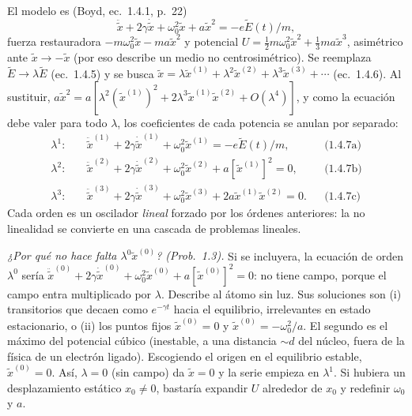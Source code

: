  El modelo es (Boyd, ec.~1.4.1, p.~22)
\[
\ddot{\tilde x}+2\gamma\dot{\tilde x}+\omega_0^2\tilde x+a\tilde x^2=-e\tilde E(t)/m,
\]
fuerza restauradora $-m\omega_0^2\tilde x-ma\tilde x^2$ y potencial $U=\tfrac12m\omega_0^2\tilde x^2+\tfrac13ma\tilde x^3$, asimétrico ante $\tilde x\to-\tilde x$ (por eso describe un medio no centrosimétrico). Se reemplaza $\tilde E\to\lambda\tilde E$ (ec.~1.4.5) y se busca $\tilde x=\lambda\tilde x^{(1)}+\lambda^2\tilde x^{(2)}+\lambda^3\tilde x^{(3)}+\cdots$ (ec.~1.4.6). Al sustituir, $a\tilde x^2=a[\lambda^2(\tilde x^{(1)})^2+2\lambda^3\tilde x^{(1)}\tilde x^{(2)}+O(\lambda^4)]$, y como la ecuación debe valer para todo $\lambda$, los coeficientes de cada potencia se anulan por separado:
\begin{align*}
\lambda^1:&\quad \ddot{\tilde x}^{(1)}+2\gamma\dot{\tilde x}^{(1)}+\omega_0^2\tilde x^{(1)}=-e\tilde E(t)/m, &&\text{(1.4.7a)}\\
\lambda^2:&\quad \ddot{\tilde x}^{(2)}+2\gamma\dot{\tilde x}^{(2)}+\omega_0^2\tilde x^{(2)}+a[\tilde x^{(1)}]^2=0, &&\text{(1.4.7b)}\\
\lambda^3:&\quad \ddot{\tilde x}^{(3)}+2\gamma\dot{\tilde x}^{(3)}+\omega_0^2\tilde x^{(3)}+2a\tilde x^{(1)}\tilde x^{(2)}=0. &&\text{(1.4.7c)}
\end{align*}
Cada orden es un oscilador \emph{lineal} forzado por los órdenes anteriores: la no linealidad se convierte en una cascada de problemas lineales.

\emph{¿Por qué no hace falta $\lambda^0\tilde x^{(0)}$? (Prob.~1.3).} Si se incluyera, la ecuación de orden $\lambda^0$ sería $\ddot{\tilde x}^{(0)}+2\gamma\dot{\tilde x}^{(0)}+\omega_0^2\tilde x^{(0)}+a[\tilde x^{(0)}]^2=0$: no tiene campo, porque el campo entra multiplicado por $\lambda$. Describe al átomo sin luz. Sus soluciones son (i) transitorios que decaen como $e^{-\gamma t}$ hacia el equilibrio, irrelevantes en estado estacionario, o (ii) los puntos fijos $\tilde x^{(0)}=0$ y $\tilde x^{(0)}=-\omega_0^2/a$. El segundo es el máximo del potencial cúbico (inestable, a una distancia $\sim d$ del núcleo, fuera de la física de un electrón ligado). Escogiendo el origen en el equilibrio estable, $\tilde x^{(0)}=0$. Así, $\lambda=0$ (sin campo) da $\tilde x=0$ y la serie empieza en $\lambda^1$. Si hubiera un desplazamiento estático $x_0\neq0$, bastaría expandir $U$ alrededor de $x_0$ y redefinir $\omega_0$ y $a$.

